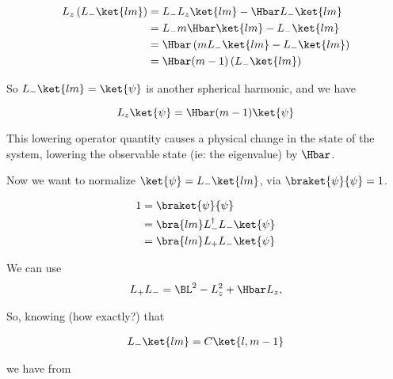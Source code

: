 \begin{equation}\label{eqn:lecture6OrbitalandIntrinsicMomentum:2140}
\begin{aligned}
L_z \left( L_{-} \ket{lm} \right)
&=
L_{-} L_z \ket{lm} - \Hbar L_{-} \ket{lm} \\
&=
L_{-} m \Hbar \ket{lm} - L_{-} \ket{lm} \\
&=
\Hbar \left( m L_{-} \ket{lm} - L_{-} \ket{lm} \right) \\
&=
\Hbar (m-1) \left( L_{-} \ket{lm} \right)
\end{aligned}
\end{equation}

So \(L_{-} \ket{lm} = \ket{\psi}\) is another spherical harmonic, and we have

\begin{equation}\label{eqn:PHY356Foct19:1013}
L_z \ket{\psi} = \Hbar (m-1) \ket{\psi}
\end{equation}

This lowering operator quantity causes a physical change in the state of the system, lowering the observable state (ie: the eigenvalue) by \(\Hbar\).

Now we want to normalize \(\ket{\psi} = L_{-} \ket{lm}\), via \(\braket{\psi}{\psi} = 1\).

\begin{equation}\label{eqn:lecture6OrbitalandIntrinsicMomentum:2160}
\begin{aligned}
1
&= \braket{\psi}{\psi} \\
&= \bra{lm} L_{-}^\dagger L_{-} \ket{\psi} \\
&= \bra{lm} L_{+} L_{-} \ket{\psi}
\end{aligned}
\end{equation}

We can use
\begin{equation}\label{eqn:PHY356Foct19:1014}
\begin{aligned}
L_{+} L_{-} = \BL^2 - L_z^2 + \Hbar L_z,
\end{aligned}
\end{equation}

So, knowing (how exactly?) that

\begin{equation}\label{eqn:PHY356Foct19:1015}
\begin{aligned}
L_{-} \ket{lm} = C \ket{l,m-1}
\end{aligned}
\end{equation}

we have from 

